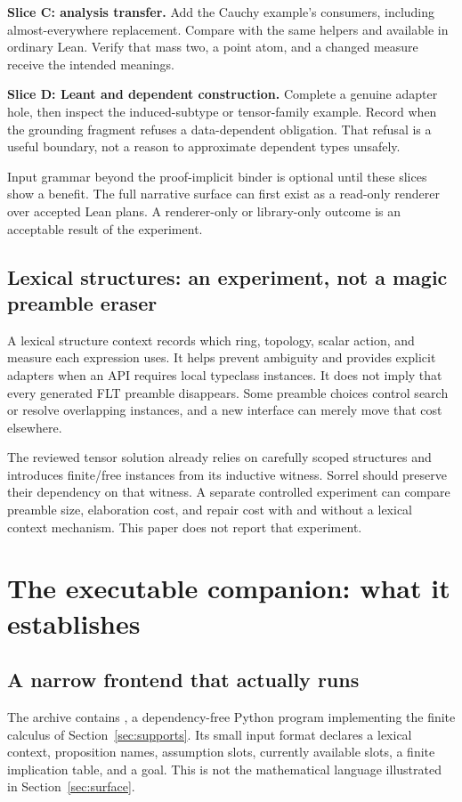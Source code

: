 \documentclass[11pt,a4paper]{article}
\newcommand{\code}[1]{\texttt{\detokenize{#1}}}
\numberwithin{equation}{section}
\theoremstyle{definition}\newtheorem{definition}[theorem]{Definition}
\theoremstyle{remark}\newtheorem{remark}[theorem]{Remark}
\begin{document}
\textbf{Slice C: analysis transfer.} Add the Cauchy example's consumers,
including almost-everywhere replacement. Compare with the same helpers and
\code{fun_prop} available in ordinary Lean. Verify that mass two, a point
atom, and a changed measure receive the intended meanings.

\textbf{Slice D: Leant and dependent construction.} Complete a genuine adapter
hole, then inspect the induced-subtype or tensor-family example. Record when
the grounding fragment refuses a data-dependent obligation. That refusal is
a useful boundary, not a reason to approximate dependent types unsafely.

Input grammar beyond the proof-implicit binder is optional until these slices
show a benefit. The full narrative surface can first exist as a read-only
renderer over accepted Lean plans. A renderer-only or library-only outcome is
an acceptable result of the experiment.

\subsection{Lexical structures: an experiment, not a magic preamble eraser}
A lexical structure context records which ring, topology, scalar action, and
measure each expression uses. It helps prevent ambiguity and provides explicit
adapters when an API requires local typeclass instances. It does not imply
that every generated FLT preamble disappears. Some preamble choices control
search or resolve overlapping instances, and a new interface can merely move
that cost elsewhere.

The reviewed tensor solution already relies on carefully scoped structures
and introduces finite/free instances from its inductive witness. Sorrel should
preserve their dependency on that witness. A separate controlled experiment
can compare preamble size, elaboration cost, and repair cost with and without
a lexical context mechanism. This paper does not report that experiment.

\section{The executable companion: what it establishes}\label{sec:companion}

\subsection{A narrow frontend that actually runs}
The archive contains \code{sorrel_model.py}, a dependency-free Python program
implementing the finite calculus of Section~\ref{sec:supports}. Its small
\code{.sorrel} input format declares a lexical context, proposition names,
assumption slots, currently available slots, a finite implication table, and
a goal. This is not the mathematical language illustrated in
Section~\ref{sec:surface}.
\end{document}
